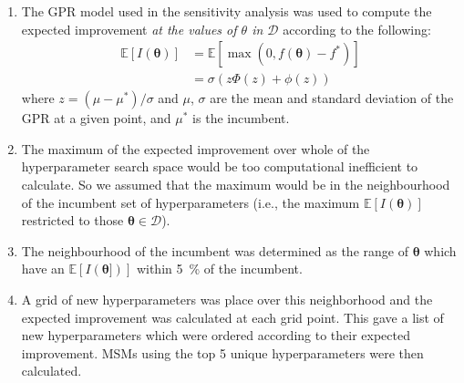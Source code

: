 \begin{enumerate}
    \item The GPR model used in the sensitivity analysis was used to compute the expected improvement \emph{at the values of $\theta$ in $\mathcal{D}$} according to the following: 
    \begin{align}
     \mathbb{E}[I(\bm{\theta})] &= \mathbb{E}[\max{(0, f(\bm{\theta})-f^{*})}] \label{eqn:ei_def} \\ 
     & = \sigma \left ( z \Phi(z)  + \phi(z) \right) \label{eqn:ei_for_gp}
    \end{align}
    where $z = (\mu-\mu^{*})/\sigma$ and $\mu$, $\sigma$ are the mean and standard deviation of the GPR at a given point, and $\mu^{*}$ is the incumbent. 
    \item The maximum of the expected improvement over whole of the hyperparameter search space would be too computational inefficient to calculate. So we assumed that the maximum would be in the neighbourhood of the incumbent set of hyperparameters (i.e., the maximum $\mathbb{E}[I(\bm{\theta})]$ restricted to those $\bm{\theta}\in \mathcal{D}$). 
    \item The neighbourhood of the incumbent was determined as the range of $\bm{\theta}$ which have an $\mathbb{E}[I(\bm{\theta}])]$ within \SI{5}{\percent} of the incumbent. 
    \item A grid of new hyperparameters was place over this neighborhood and the expected improvement was calculated at each grid point.  This gave a list of new hyperparameters which were ordered according to their expected improvement.  MSMs using the top 5 unique hyperparameters were then calculated. 
\end{enumerate}







